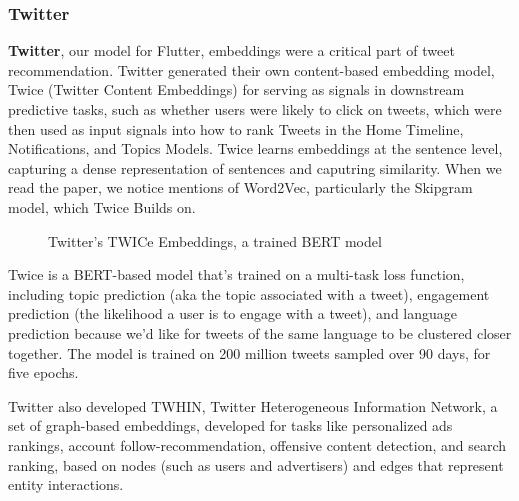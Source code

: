 \documentclass[11pt, table]{diazessay} %
\begin{document}
\begin{sloppypar}
\subsubsection{Twitter}
\textbf{Twitter}, our model for Flutter, embeddings were a critical part of tweet recommendation. Twitter generated their own content-based embedding model, Twice (Twitter Content Embeddings)\citep{liu2022twice} for serving as signals in downstream predictive tasks, such as whether users were likely to click on tweets, which were then used as input signals into how to rank Tweets in the Home Timeline, Notifications, and Topics Models. Twice learns embeddings at the sentence level, capturing a dense representation of sentences and caputring similarity. When we read the paper, we notice mentions of Word2Vec, particularly the Skipgram model, which Twice Builds on. 

\begin{figure}[H]
\caption{Twitter's TWICe Embeddings, a trained BERT model\citep{liu2022twice}}
\end{figure}

Twice is a BERT-based model that's trained on a multi-task loss function, including topic prediction (aka the topic associated with a tweet), engagement prediction (the likelihood a user is to engage with a tweet), and language prediction because we'd like for tweets of the same language to be clustered closer together. The model is trained on 200 million tweets sampled over 90 days, for five epochs.

Twitter also developed TWHIN\citep{el2022twhin}, Twitter Heterogeneous Information Network, a set of graph-based embeddings\citep{el2022twhin}, developed for tasks like personalized ads rankings, account follow-recommendation, offensive content detection, and search ranking, based on nodes (such as users and advertisers) and edges that represent entity interactions. 


\end{sloppypar}
\end{document}
